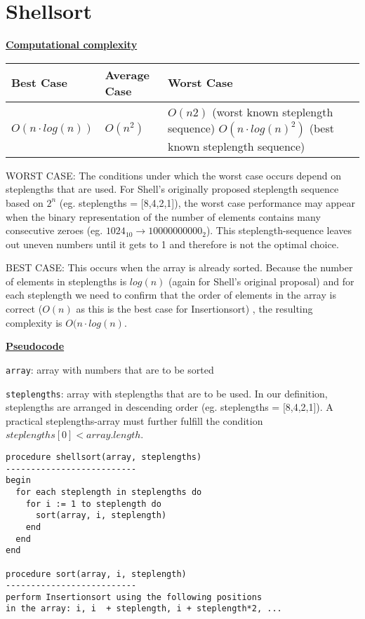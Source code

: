 \documentclass[a4paper]{report}
\begin{document}
\chapter*{Shellsort}

\underline{\bf{Computational complexity}}

\begin{tabular}{|l|l|p{7cm} l |}
\hline
Best Case    & Average Case  &  Worst Case\\ \hline
$O(n\cdot log(n))$ & $O(n^2)$  &  $O(n2)$ (worst known steplength sequence) $O(n\cdot log(n)^2)$ (best known steplength sequence) \\ \hline
\end{tabular}

WORST CASE: The conditions under which the worst case occurs depend on steplengths that are used. For Shell's originally proposed steplength sequence based on $2^n$ (eg. steplengths = [8,4,2,1]), the worst case performance may appear when the binary representation of the number of elements contains many consecutive zeroes (eg. $1024_{10} \rightarrow 10000000000_2$). This steplength-sequence leaves out uneven numbers until it gets to 1 and therefore is not the optimal choice.

BEST CASE: This occurs when the array is already sorted. Because the number of elements in steplengths is $log(n)$ (again for Shell's original proposal) and for each steplength we need to confirm that the order of elements in the array is correct ($O(n)$ as this is the best case for Insertionsort) , the resulting complexity is $O(n \cdot log(n)$.


\underline{\bf{Pseudocode}}

\texttt{array}: array with numbers that are to be sorted

\texttt{steplengths}: array with steplengths that are to be used. In our definition, steplengths are arranged in descending order (eg. steplengths = [8,4,2,1]). A practical steplengths-array must further fulfill the condition $steplengths[0] < array.length$. 


\begin{lstlisting}
procedure shellsort(array, steplengths)
--------------------------
begin
  for each steplength in steplengths do
    for i := 1 to steplength do
  	  sort(array, i, steplength)   
    end
  end
end

procedure sort(array, i, steplength)
--------------------------
perform Insertionsort using the following positions
in the array: i, i  + steplength, i + steplength*2, ...

\end{lstlisting}
\end{document}
